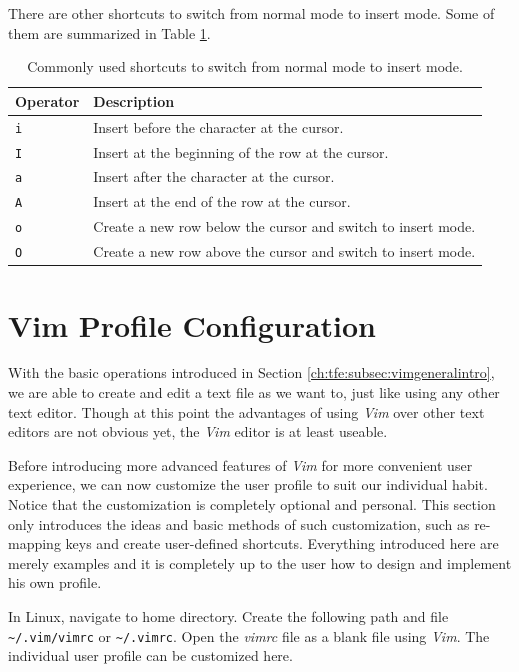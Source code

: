 There are other shortcuts to switch from normal mode to insert mode. Some of them are summarized in Table \ref{ch3tab:switchtoinsert}.

\begin{table}
  \centering \caption{Commonly used shortcuts to switch from normal mode to insert mode.}\label{ch3tab:switchtoinsert}
  \begin{tabularx}{\textwidth}{lX}
    \hline
    Operator & Description \\ \hline
    \verb|i| & Insert before the character at the cursor. \\ \hdashline
    \verb|I| & Insert at the beginning of the row at the cursor. \\ \hdashline
    \verb|a| & Insert after the character at the cursor. \\ \hdashline
    \verb|A| & Insert at the end of the row at the cursor. \\ \hdashline
    \verb|o| & Create a new row below the cursor and switch to insert mode. \\ \hdashline
    \verb|O| & Create a new row above the cursor and switch to insert mode. \\
    \hline
  \end{tabularx}
\end{table}

\section{Vim Profile Configuration}

With the basic operations introduced in Section \ref{ch:tfe:subsec:vimgeneralintro}, we are able to create and edit a text file as we want to, just like using any other text editor. Though at this point the advantages of using \textit{Vim} over other text editors are not obvious yet, the \textit{Vim} editor is at least useable.

Before introducing more advanced features of \textit{Vim} for more convenient user experience, we can now customize the user profile to suit our individual habit. Notice that the customization is completely optional and personal. This section only introduces the ideas and basic methods of such customization, such as re-mapping keys and create user-defined shortcuts. Everything introduced here are merely examples and it is completely up to the user how to design and implement his own profile.

In Linux, navigate to home directory. Create the following path and file \verb|~/.vim/vimrc| or \verb|~/.vimrc|. Open the \textit{vimrc} file as a blank file using \textit{Vim}. The individual user profile can be customized here.

